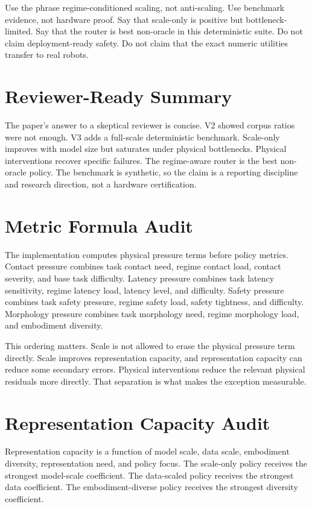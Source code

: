 Use the phrase regime-conditioned scaling, not anti-scaling. Use benchmark evidence, not hardware proof. Say that scale-only is positive but bottleneck-limited. Say that the router is best non-oracle in this deterministic suite. Do not claim deployment-ready safety. Do not claim that the exact numeric utilities transfer to real robots.

\section{Reviewer-Ready Summary}

The paper's answer to a skeptical reviewer is concise. V2 showed corpus ratios were not enough. V3 adds a full-scale deterministic benchmark. Scale-only improves with model size but saturates under physical bottlenecks. Physical interventions recover specific failures. The regime-aware router is the best non-oracle policy. The benchmark is synthetic, so the claim is a reporting discipline and research direction, not a hardware certification.

\section{Metric Formula Audit}

The implementation computes physical pressure terms before policy metrics. Contact pressure combines task contact need, regime contact load, contact severity, and base task difficulty. Latency pressure combines task latency sensitivity, regime latency load, latency level, and difficulty. Safety pressure combines task safety pressure, regime safety load, safety tightness, and difficulty. Morphology pressure combines task morphology need, regime morphology load, and embodiment diversity.

This ordering matters. Scale is not allowed to erase the physical pressure term directly. Scale improves representation capacity, and representation capacity can reduce some secondary errors. Physical interventions reduce the relevant physical residuals more directly. That separation is what makes the exception measurable.

\section{Representation Capacity Audit}

Representation capacity is a function of model scale, data scale, embodiment diversity, representation need, and policy focus. The scale-only policy receives the strongest model-scale coefficient. The data-scaled policy receives the strongest data coefficient. The embodiment-diverse policy receives the strongest diversity coefficient.

